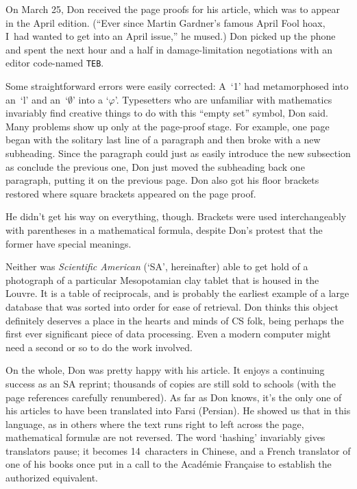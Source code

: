 On March 25, Don received the page proofs for his article, which was to
appear in the April edition. (``Ever since Martin Gardner's famous
April Fool hoax, I~had wanted to get into an April issue,'' he mused.)
Don picked up the phone and spent the next hour and a half in
damage-limitation negotiations with an editor code-named {\tt TEB}.

\vfill\eject
Some straightforward errors were easily corrected: A~`1' had
metamorphosed into an~`l'  and an~`$\emptyset$' into a `$\varphi$'. Typesetters who
are unfamiliar with mathematics invariably find creative things to do
with this ``empty set'' symbol, Don said.  Many problems show up only at
the page-proof stage. For example, one page began with the solitary
last line of a paragraph and then broke with a new subheading. Since
the paragraph could just as easily introduce the new subsection as
conclude the previous one, Don just moved the subheading back one
paragraph, putting it
on the previous page.  Don also got his floor brackets restored
where square brackets appeared on the page proof.

He didn't get his way on everything, though.
 Brackets were used
interchangeably with parentheses in a mathematical formula, despite
Don's protest that the former have special meanings.

Neither was {\sl Scientific American\/} (`SA', hereinafter) able to get hold
of a photograph of a particular Mesopotamian clay tablet that is
housed in the Louvre. It is a table of reciprocals, and is probably
the earliest example of a large database that was sorted into order
for ease of retrieval.
Don thinks this object definitely
deserves a place in the hearts and minds of CS folk, being perhaps the
first ever significant piece of data processing. Even a modern
computer might need a second or so to do the work involved.

On the whole, Don was pretty happy with his article. It enjoys a
continuing success as an SA reprint; thousands of copies are still sold
to schools (with the page references carefully renumbered).  As far as
Don knows, it's the only one of his articles to have been translated
into Farsi (Persian). He showed us that in this 
language, as in others where the
text runs right to left across the page, mathematical formul{\ae} are not
reversed. The word `hashing' invariably gives translators pause; it
becomes 14~characters in Chinese, and a French translator 
of one of his books once put in a
call to the Acad\'emie Fran{\c c}aise to establish the authorized equivalent.

